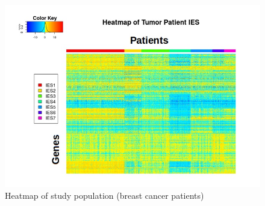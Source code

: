 \documentclass[a4paper, 11pt]{article}
\begin{document}
\begin{figure}[!tpb]
  \begin{center}
    \includegraphics[width=12 cm]{figure4.jpg}
    \caption{Heatmap of study population (breast cancer patients)}
    \label{fig:HM}
  \end{center}
\end{figure}
\end{document}
